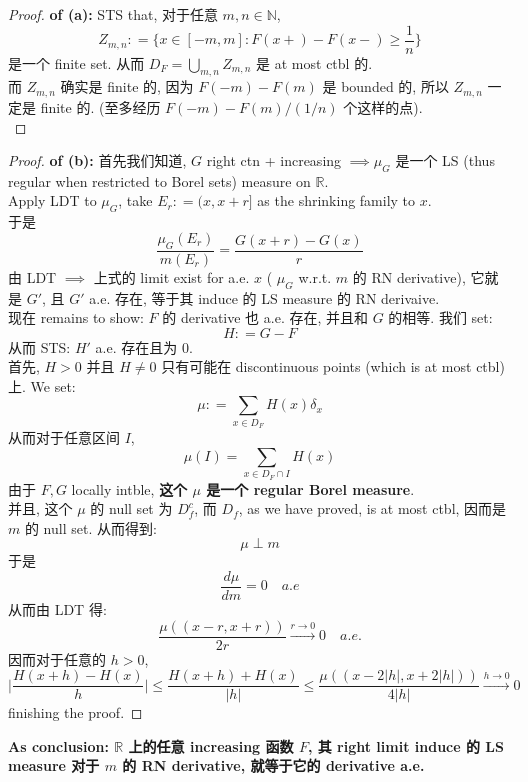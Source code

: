 \documentclass[lang=cn,11pt]{elegantbook}
\begin{document}
\begin{proof}
    \textbf{of (a):} STS that, 对于任意 $m,n \in \mathbb{N}$, \[
    Z_{m,n}: = \bigg \{ x\in [-m,m] : F(x+) - F(x-)  \geq \frac{1}{n} \bigg \}
    \]是一个 finite set. 从而 $D_F = \bigcup_{m,n} Z_{m,n}$ 是 at most ctbl 的.\\
 而 $Z_{m,n}$ 确实是 finite 的, 因为 $F(-m) - F(m)$ 是 bounded 的, 所以 $Z_{m,n}$ 一定是 finite 的. (至多经历 $F(-m) - F(m) / (1/n)$ 个这样的点).\\
\end{proof}
\begin{proof}
    \textbf{of (b):}
首先我们知道, $G$ right ctn + increasing $\implies \mu_G$ 是一个 LS (thus regular when restricted to Borel sets) measure on $\mathbb{R}$.\\
Apply LDT to $\mu_G$, take $E_r : = (x,x+r]$ as the shrinking family to $x$.\\
于是
\[
\frac{\mu_G(E_r)}{m(E_r)}  = \frac{G(x+r)-G(x)}{r}
\]
由 LDT \(\implies\) 上式的 limit exist for a.e. $x$ ( $\mu_G$ w.r.t. $m$ 的 RN derivative), 它就是 $G'$, 且 $G'$ a.e. 存在, 等于其 induce 的 LS measure 的 RN derivaive. \\
现在 remains to show: $F$ 的 derivative 也 a.e. 存在, 并且和 $G$ 的相等. 我们 set: \[
H: = G- F
\]
从而 STS: $H'$ a.e. 存在且为 $0$.\\
首先, $H>0$ 并且 $H \not = 0$ 只有可能在 discontinuous points (which is at most ctbl)上. We set: \[
\mu : = \sum_{x\in D_F} H(x) \delta_x  
\]
从而对于任意区间 $I$, $$
\mu(I)=\sum_{x \in D_F \cap I} H(x)
$$
由于 $F,G$ locally intble,\textbf{ 这个 $\mu$ 是一个 regular Borel measure}.\\
并且, 这个 $\mu$ 的 null set 为 $D_f^c$, 而 $D_f$, as we have proved, is at most ctbl, 因而是 $m$ 的 null set. 从而得到: \[
\mu \perp m
\]于是 \[
\frac{d\mu}{d m} = 0\quad a.e
\]
从而由 LDT 得: \[
\frac{\mu((x-r,x+r))}{2r} \overset{r\to 0}{\to} 0 \quad a.e.
\]
因而对于任意的 $h> 0$,  \[
 \bigg|\frac{H(x+h) - H(x)}{h} \bigg| \leq \frac{H(x+h) + H(x)}{|h|}\leq \frac{\mu((x-2|h|,x+2|h|))}{4|h|} \overset{h\to 0}{\to} 0 
\]
finishing the proof.
\end{proof}
\begin{remark}
\textbf{As conclusion: \(\mathbb{R}\) 上的任意 increasing 函数 $F$, 其 right limit induce 的 LS measure 对于 $m$ 的 RN derivative, 就等于它的 derivative a.e.}
\end{remark}
\end{document}
